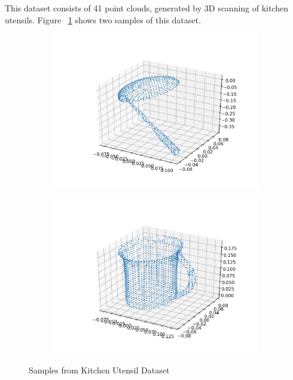 \documentclass[10pt]{article}
\begin{document}
This dataset \cite{Neumann13mlg} consists of 41 point clouds, generated by 3D scanning of kitchen utensils.
Figure ~\ref{fig:kitchen_dataset} shows two samples of this dataset.

\begin{figure}[H]
    \centering
    \begin{subfigure}[h]{0.4\textwidth}
        \includegraphics[width=\linewidth]{db_sample1}
    \end{subfigure}
    \begin{subfigure}[h]{0.4\textwidth}
        \includegraphics[width=\linewidth]{db_sample2}
    \end{subfigure}%
    \caption{Samples from Kitchen Utensil Dataset}
    \label{fig:kitchen_dataset}
\end{figure}
\end{document}
